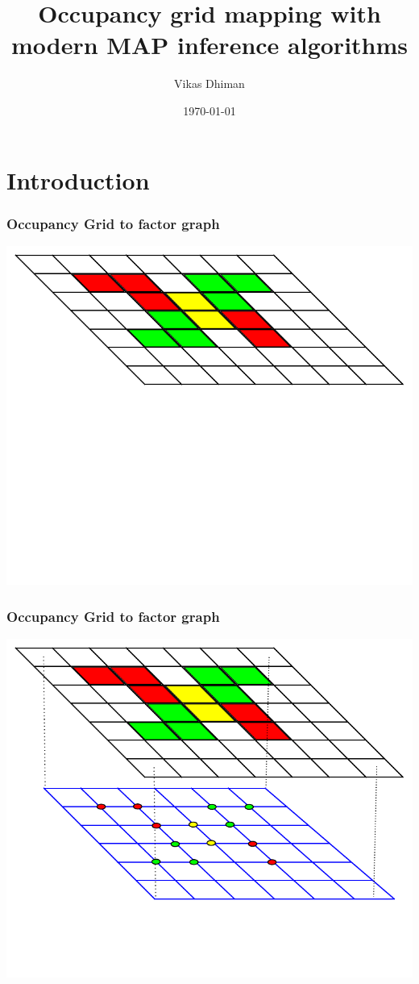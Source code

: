 \documentclass{beamer}
\title{Occupancy grid mapping with modern MAP inference algorithms}
\author{Vikas Dhiman}
\date{\today}
\institute{\url{vikasdhi@buffalo.edu}}
\begin{document}
\begin{frame}
\titlepage
\end{frame}


\section{Introduction}


\begin{frame}
\frametitle{Occupancy Grid to factor graph}
\includegraphics[width=\textwidth]{figures/factorgraph/fg1.pdf}
\end{frame}

\begin{frame}
\frametitle{Occupancy Grid to factor graph}
\includegraphics[width=\textwidth]{figures/factorgraph/fg2.pdf}
\end{frame}
\end{document}
